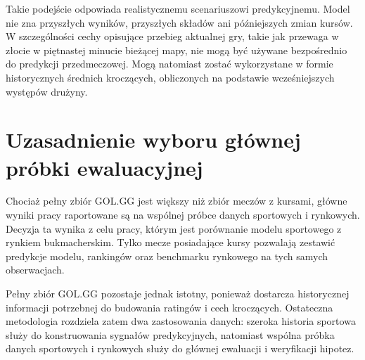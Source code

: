 Takie podejście odpowiada realistycznemu scenariuszowi predykcyjnemu. Model nie zna przyszłych
wyników, przyszłych składów ani późniejszych zmian kursów. W szczególności cechy opisujące przebieg
aktualnej gry, takie jak przewaga w złocie w piętnastej minucie bieżącej mapy, nie mogą być używane
bezpośrednio do predykcji przedmeczowej. Mogą natomiast zostać wykorzystane w formie historycznych
średnich kroczących, obliczonych na podstawie wcześniejszych występów drużyny.

\section{Uzasadnienie wyboru głównej próbki ewaluacyjnej}

Chociaż pełny zbiór GOL.GG jest większy niż zbiór meczów z kursami, główne wyniki pracy raportowane
są na wspólnej próbce danych sportowych i rynkowych. Decyzja ta wynika z celu pracy, którym jest
porównanie modelu sportowego z rynkiem bukmacherskim. Tylko mecze posiadające kursy pozwalają
zestawić predykcje modelu, rankingów oraz benchmarku rynkowego na tych samych obserwacjach.

Pełny zbiór GOL.GG pozostaje jednak istotny, ponieważ dostarcza historycznej informacji potrzebnej
do budowania ratingów i cech kroczących. Ostateczna metodologia rozdziela zatem dwa zastosowania
danych: szeroka historia sportowa służy do konstruowania sygnałów predykcyjnych, natomiast wspólna
próbka danych sportowych i rynkowych służy do głównej ewaluacji i weryfikacji hipotez.
